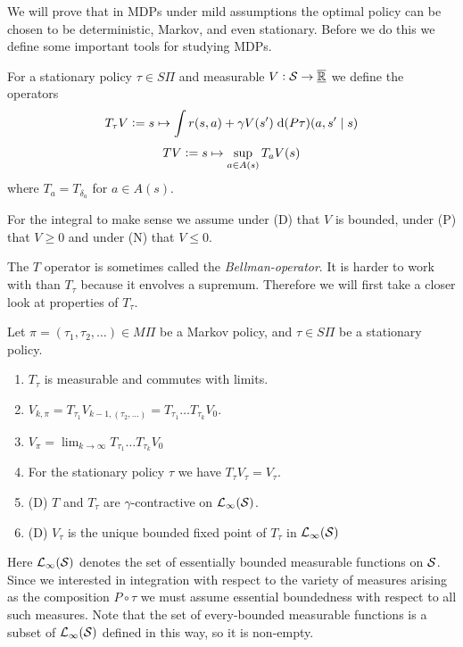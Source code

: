 We will prove that in MDPs under mild assumptions the optimal policy
can be chosen to be deterministic, Markov, and even stationary.
Before we do this we define some important tools for studying MDPs.

\begin{defn}
  For a stationary policy $\tau \in S\Pi$ and measurable $V:\mathcal{S} \to \overline{\underline{\mathbb{R}}}$
  we define the operators 
  \[ T_\tau V \vcentcolon= s \mapsto \int r(s, a)
  + \gamma V(s') \; \mathrm{d} (P \tau)(a, s'\mid s) \]
  \[ T V \vcentcolon= s \mapsto \sup_{a \in A(s)} T_a V(s) \]
  where $T_a = T_{\delta_a}$ for $a \in A(s)$.
\end{defn}
\begin{rem}
  For the integral to make sense we assume under (D) that $V$ is bounded,
  under (P) that $V\geq 0$ and under (N) that $V \leq 0$.
\end{rem}

The $T$ operator is sometimes called the \emph{Bellman-operator}. %
It is harder to work with than $T_\tau$ because it envolves a supremum.
Therefore we will first take a closer look at properties of $T_\tau$.

\begin{prop}
  Let $\pi = (\tau_1, \tau_2, \dots) \in M\Pi$ be a Markov policy,
  and $\tau \in S\Pi$ be a stationary policy.
  \begin{enumerate}
    \item $T_\tau$ is measurable and commutes with limits.
    \item $V_{k, \pi} = T_{\tau_1} V_{k-1, (\tau_2, \dots)}
      = T_{\tau_1} \dots T_{\tau_k} V_0$.
    \item $V_\pi = \lim_{k \to \infty} T_{\tau_1} \dots T_{\tau_k} V_0$
    \item For the stationary policy $\tau$ we have $T_\tau V_\tau = V_\tau$.
    \item (D) $T$ and $T_\tau$ are $\gamma$-contractive
      on $\mathcal{L}_\infty(\mathcal{S})$.
    \item (D) $V_\tau$ is the unique bounded fixed point of $T_\tau$
      in $\mathcal{L}_\infty(\mathcal{S})$
  \end{enumerate} 
  \label{prop:propTpiV}
\end{prop}

\begin{rem}
  Here $\mathcal{L}_\infty(\mathcal{S})$ denotes the set of essentially bounded
  measurable functions on $\mathcal{S}$. Since we interested in integration
  with respect to the variety of measures arising as the composition
  $P \circ \tau$ we must assume essential boundedness with respect to
  all such measures. Note that the set of every-bounded measurable functions
  is a subset of $\mathcal{L}_\infty(\mathcal{S})$ defined in this way, so it is
  non-empty.
\end{rem}

